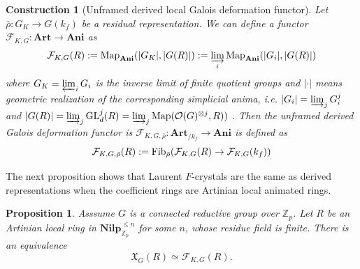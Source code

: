 \documentclass[10pt]{article}
\newtheorem{prop}[thm]{Proposition}
\newtheorem{cons}[thm]{Construction}
\numberwithin{equation}{section}
\newcommand{\frakX}{{\mathfrak X}}
\newcommand{\bZ}{{\mathbb Z}}
\newcommand{\calF}{{\mathcal F}}
\newcommand{\calO}{{\mathcal O}}
\newcommand{\Map}{\mathrm{Map}}
\newcommand{\GL}{{\mathrm{GL}}}             %
\begin{document}
\begin{cons}[Unframed derived local Galois deformation functor]
    Let $\bar \rho:G_K\to G(k_f)$ be a residual representation. We can define a functor $\calF_{K,G}:{\textbf{Art}}\to \textbf{Ani}$ as
    \[
    \calF_{K,G}(R):=\Map_{\textbf{Ani}}(|G_K|,|G(R)|):=\varinjlim_i\Map_{\textbf{Ani}}(|G_i|,|G(R)|)
    \]
    where $G_K=\varprojlim_iG_i$ is the inverse limit of finite quotient groups and $|\cdot|$ means geometric realization of the corresponding simplicial anima, i.e. $|G_i|=\varinjlim_jG_i^j$ and $|G(R)|=\varinjlim_j\GL_d^j(R)=\varinjlim_j\Map(\calO(G)^{\otimes j},R))$ . Then the unframed derived Galois deformation functor is $\calF_{K,G,\bar\rho}:{\textbf{Art}_{/k_f}}\to \textbf{Ani}$ is defined as
    \[
   \calF_{K,G,\bar\rho}(R):={\rm Fib}_{\bar\rho}( \calF_{K,G}(R)\to  \calF_{K,G}(k_f))
    \]
\end{cons}

The next proposition shows that Laurent $F$-crystals are the same as derived representations when the coefficient rings are Artinian local animated rings.

\begin{prop}\label{derivedrep-laurent}
Asssume $G$ is a connected reductive group over $\bZ_p$.    Let $R$ be an Artinian local ring in $\textbf{Nilp}_{\bZ_p}^{\leq n}$ for some $n$, whose residue field is finite. There is an equivalence
    \[
    \frakX_G(R)\simeq \calF_{K,G}(R). 
    \]
\end{prop}
\end{document}
